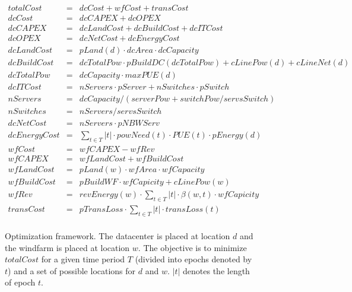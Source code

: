 \begin{figure*}
\begin{eqnarray}
	totalCost & = & dcCost + wfCost + transCost \\
	dcCost & = & dcCAPEX + dcOPEX \\
        dcCAPEX & = & dcLandCost + dcBuildCost + dcITCost \\
        dcOPEX & = & dcNetCost + dcEnergyCost \\
        dcLandCost & = & pLand(d) \cdot dcArea \cdot dcCapacity \\
        dcBuildCost & = & dcTotalPow \cdot pBuildDC(dcTotalPow) +
            cLinePow(d) + cLineNet(d) \\
        dcTotalPow & = & dcCapacity \cdot maxPUE(d) \\
        dcITCost & = & nServers \cdot pServer + nSwitches \cdot
            pSwitch \\
        nServers & = & dcCapacity / (serverPow + switchPow / servsSwitch)\\
        nSwitches & = & nServers / servsSwitch\\
        dcNetCost & = & nServers \cdot pNBWServ \\
        dcEnergyCost & = & \sum_{t \in T} {|t| \cdot powNeed(t) \cdot PUE(t) \cdot pEnergy(d) } \\
 	wfCost & = & wfCAPEX - wfRev  \\
        wfCAPEX & = & wfLandCost + wfBuildCost \\
        wfLandCost & = & pLand(w) \cdot wfArea \cdot wfCapacity \\
        wfBuildCost & = & pBuildWF \cdot wfCapicity + cLinePow(w) \\
        wfRev & = & revEnergy(w) \cdot  \sum_{t \in T}{ |t| \cdot
            \beta(w,t) \cdot wfCapicity } \\
        transCost & = & pTransLoss \cdot \sum_{t \in T}{ |t| \cdot transLoss(t)} \\%
\end{eqnarray}
\caption{Optimization framework.  The datacenter is placed at location $d$ and the windfarm is placed at location $w$.  The objective is to minimize $totalCost$ for a given time period $T$ (divided into epochs denoted by $t$) and a set of possible locations for $d$ and $w$.  $|t|$ denotes the length of epoch $t$.}
\label{fig:optimization}
\end{figure*}


